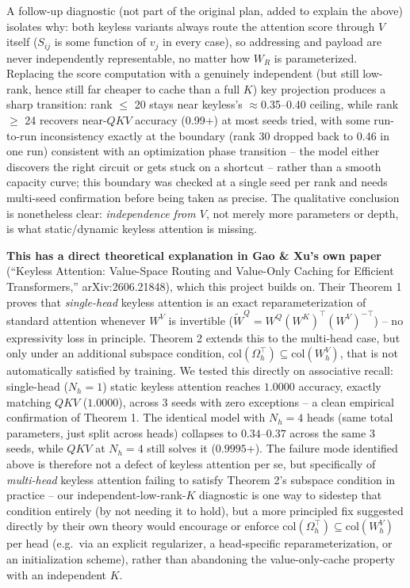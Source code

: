 \documentclass[11pt,a4paper]{article}
\begin{document}
A follow-up diagnostic (not part of the original plan, added to explain the
above) isolates why: both keyless variants always route the attention score
through $V$ itself ($S_{ij}$ is some function of $v_j$ in every case), so
addressing and payload are never independently representable, no matter how
$W_R$ is parameterized. Replacing the score computation with a genuinely
independent (but still low-rank, hence still far cheaper to cache than a full
$K$) key projection produces a sharp transition: rank $\le$ 20 stays near
keyless's $\approx$0.35--0.40 ceiling, while rank $\ge$ 24 recovers
near-$QKV$ accuracy (0.99+) at most seeds tried, with some run-to-run
inconsistency exactly at the boundary (rank 30 dropped back to 0.46 in one
run) consistent with an optimization phase transition -- the model either
discovers the right circuit or gets stuck on a shortcut -- rather than a
smooth capacity curve; this boundary was checked at a single seed per rank
and needs multi-seed confirmation before being taken as precise. The
qualitative conclusion is nonetheless clear: \emph{independence from $V$},
not merely more parameters or depth, is what static/dynamic keyless attention
is missing.

\textbf{This has a direct theoretical explanation in Gao \& Xu's own paper}
(``Keyless Attention: Value-Space Routing and Value-Only Caching for
Efficient Transformers,'' arXiv:2606.21848), which this project builds on.
Their Theorem 1 proves that \emph{single-head} keyless attention is an exact
reparameterization of standard attention whenever $W^V$ is invertible
($\tilde{W}^Q = W^Q(W^K)^\top(W^V)^{-\top}$) -- no expressivity loss in
principle. Theorem 2 extends this to the multi-head case, but only under an
additional subspace condition, $\mathrm{col}(\Omega_h^\top) \subseteq
\mathrm{col}(W^V_h)$, that is not automatically satisfied by training. We
tested this directly on associative recall: single-head ($N_h{=}1$) static
keyless attention reaches $1.0000$ accuracy, exactly matching $QKV$ ($1.0000$),
across 3 seeds with zero exceptions -- a clean empirical confirmation of
Theorem 1. The identical model with $N_h{=}4$ heads (same total parameters,
just split across heads) collapses to $0.34$--$0.37$ across the same 3 seeds,
while $QKV$ at $N_h{=}4$ still solves it ($0.9995$+). The failure mode
identified above is therefore not a defect of keyless attention per se, but
specifically of \emph{multi-head} keyless attention failing to satisfy
Theorem 2's subspace condition in practice -- our independent-low-rank-$K$
diagnostic is one way to sidestep that condition entirely (by not needing it
to hold), but a more principled fix suggested directly by their own theory
would encourage or enforce $\mathrm{col}(\Omega_h^\top) \subseteq
\mathrm{col}(W^V_h)$ per head (e.g.\ via an explicit regularizer, a
head-specific reparameterization, or an initialization scheme), rather than
abandoning the value-only-cache property with an independent $K$.
\end{document}

